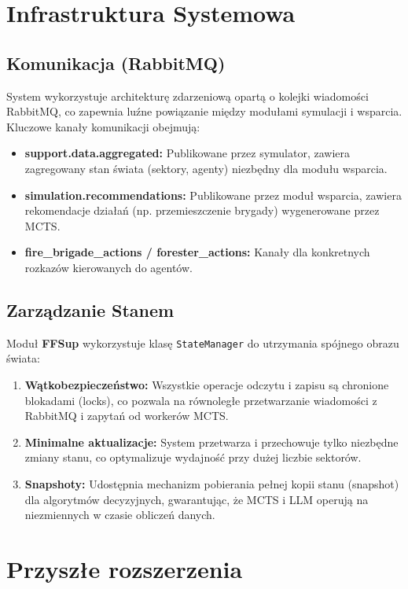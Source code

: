 \documentclass[11pt,a4paper]{article}
\begin{document}
\section{Infrastruktura Systemowa}

\subsection{Komunikacja (RabbitMQ)}
System wykorzystuje architekturę zdarzeniową opartą o kolejki wiadomości RabbitMQ, co zapewnia luźne powiązanie między modułami symulacji i wsparcia. Kluczowe kanały komunikacji obejmują:

\begin{itemize}
    \item \textbf{support.data.aggregated:} Publikowane przez symulator, zawiera zagregowany stan świata (sektory, agenty) niezbędny dla modułu wsparcia.
    \item \textbf{simulation.recommendations:} Publikowane przez moduł wsparcia, zawiera rekomendacje działań (np. przemieszczenie brygady) wygenerowane przez MCTS.
    \item \textbf{fire\_brigade\_actions / forester\_actions:} Kanały dla konkretnych rozkazów kierowanych do agentów.
\end{itemize}

\subsection{Zarządzanie Stanem}
Moduł \textbf{FFSup} wykorzystuje klasę \texttt{StateManager} do utrzymania spójnego obrazu świata:
\begin{enumerate}
    \item \textbf{Wątkobezpieczeństwo:} Wszystkie operacje odczytu i zapisu są chronione blokadami (locks), co pozwala na równoległe przetwarzanie wiadomości z RabbitMQ i zapytań od workerów MCTS.
    \item \textbf{Minimalne aktualizacje:} System przetwarza i przechowuje tylko niezbędne zmiany stanu, co optymalizuje wydajność przy dużej liczbie sektorów.
    \item \textbf{Snapshoty:} Udostępnia mechanizm pobierania pełnej kopii stanu (snapshot) dla algorytmów decyzyjnych, gwarantując, że MCTS i LLM operują na niezmiennych w czasie obliczeń danych.
\end{enumerate}

\section{Przyszłe rozszerzenia}
\end{document}
